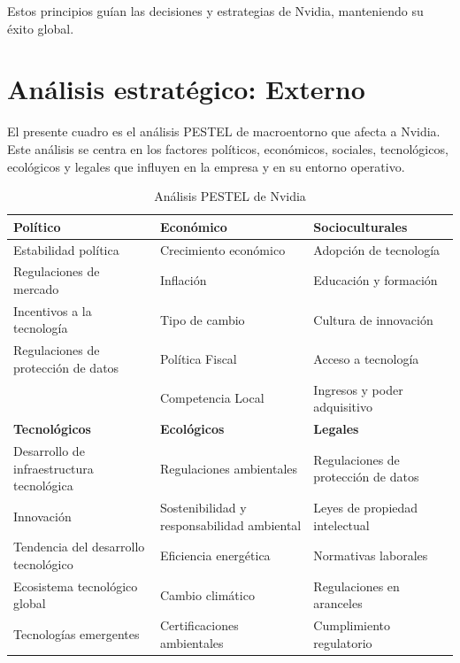 \documentclass{article}
\begin{document}
Estos principios guían las decisiones y estrategias de Nvidia, manteniendo su éxito global.

\newpage

\section{Análisis estratégico: Externo}

El presente cuadro es el análisis PESTEL de macroentorno que afecta a Nvidia. Este análisis se centra en los factores políticos, económicos, sociales, tecnológicos, ecológicos y legales que influyen en la empresa y en su entorno operativo.

\begin{table}[h!]
  \centering
  \renewcommand{\arraystretch}{1.5}
  \setlength{\tabcolsep}{10pt}
  \begin{tabular}{|p{4.5cm}|p{4.5cm}|p{4.5cm}|}
    \hline
    \textbf{Político} & \textbf{Económico} & \textbf{Socioculturales} \\ \hline
    Estabilidad política & Crecimiento económico & Adopción de tecnología \\ 
    Regulaciones de mercado & Inflación & Educación y formación \\ 
    Incentivos a la tecnología & Tipo de cambio & Cultura de innovación \\ 
    Regulaciones de protección de datos & Política Fiscal & Acceso a tecnología \\ 
    & Competencia Local & Ingresos y poder adquisitivo \\ \hline
    \textbf{Tecnológicos} & \textbf{Ecológicos} & \textbf{Legales} \\ \hline
    Desarrollo de infraestructura tecnológica & Regulaciones ambientales & Regulaciones de protección de datos \\ 
    Innovación & Sostenibilidad y responsabilidad ambiental & Leyes de propiedad intelectual \\ 
    Tendencia del desarrollo tecnológico & Eficiencia energética & Normativas laborales \\ 
    Ecosistema tecnológico global & Cambio climático & Regulaciones en aranceles \\ 
    Tecnologías emergentes & Certificaciones ambientales & Cumplimiento regulatorio \\ \hline
  \end{tabular}
  \caption{Análisis PESTEL de Nvidia}
  \label{tab:PESTEL}
\end{table}
\end{document}
